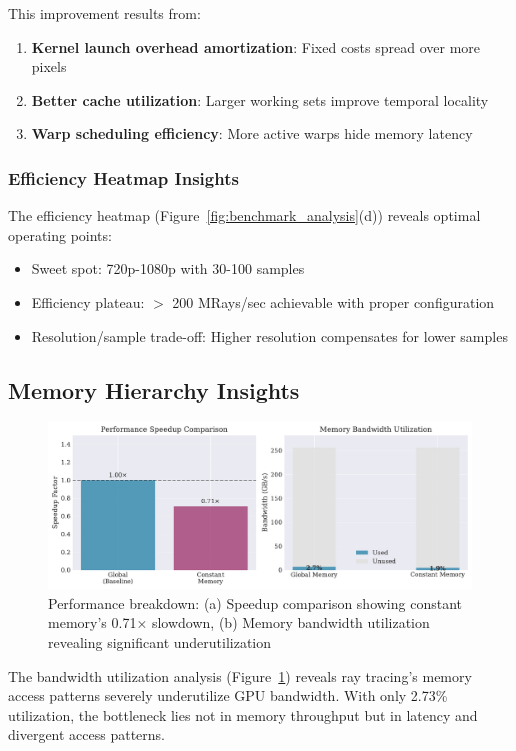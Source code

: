 \documentclass[conference]{IEEEtran}
\begin{document}
This improvement results from:
\begin{enumerate}
    \item \textbf{Kernel launch overhead amortization}: Fixed costs spread over more pixels
    \item \textbf{Better cache utilization}: Larger working sets improve temporal locality
    \item \textbf{Warp scheduling efficiency}: More active warps hide memory latency
\end{enumerate}

\subsubsection{Efficiency Heatmap Insights}
The efficiency heatmap (Figure~\ref{fig:benchmark_analysis}(d)) reveals optimal operating points:
\begin{itemize}
    \item Sweet spot: 720p-1080p with 30-100 samples
    \item Efficiency plateau: $>$ 200 MRays/sec achievable with proper configuration
    \item Resolution/sample trade-off: Higher resolution compensates for lower samples
\end{itemize}

\subsection{Memory Hierarchy Insights}

\begin{figure}[ht]
\centering
\includegraphics[width=\columnwidth]{figures/performance_breakdown.pdf}
\caption{Performance breakdown: (a) Speedup comparison showing constant memory's 0.71× slowdown, (b) Memory bandwidth utilization revealing significant underutilization}
\label{fig:performance_breakdown}
\end{figure}

The bandwidth utilization analysis (Figure~\ref{fig:performance_breakdown}) reveals ray tracing's memory access patterns severely underutilize GPU bandwidth. With only 2.73\% utilization, the bottleneck lies not in memory throughput but in latency and divergent access patterns.
\end{document}

